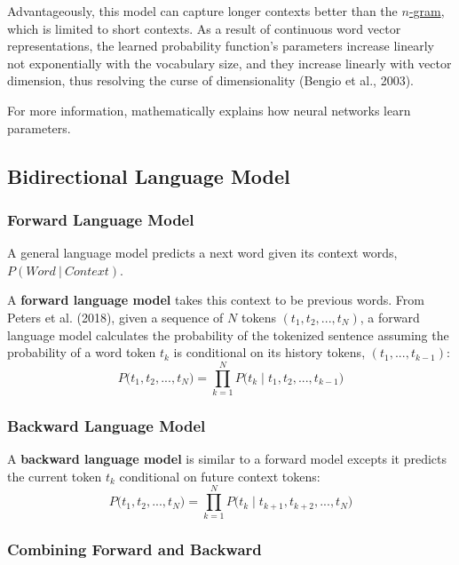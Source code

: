 Advantageously, this model can capture longer contexts better than the \hyperref[sec:NGramLM]{$n$-gram}, which is limited to short contexts. As a result of continuous word vector representations, the learned probability function's parameters increase linearly not exponentially with the vocabulary size, and they increase linearly with vector dimension, thus resolving the curse of dimensionality (Bengio et al., 2003).  

For more information,  mathematically explains how neural networks learn parameters. 


\subsection{Bidirectional Language Model} \label{sec:BidirectionalLM}

\subsubsection{Forward Language Model} \label{sec:ForwardLM}

A general language model predicts a next word given its context words, $P(\textit{Word} \: | \: \textit{Context})$. 

A \textbf{forward language model} takes this context to be previous words. From Peters et al. (2018), given a sequence of $N$ tokens $(t_1, t_2, ..., t_N)$, a forward language model calculates the probability of the tokenized sentence assuming the probability of a word token $t_k$ is conditional on its history tokens, $(t_1, ..., t_{k-1})$:
$$
P \Big(t_1, t_2, ..., t_N \Big) = \prod_{k=1}^N P \Big(t_k \; | \; t_1, t_2, ..., t_{k-1} \Big)
$$

\subsubsection{Backward Language Model} \label{sec:BackwardLM}

A \textbf{backward language model} is similar to a forward model excepts it predicts the current token $t_k$ conditional on future context tokens:
$$
P \Big(t_1, t_2, ..., t_N \Big) = \prod_{k=1}^N P \Big(t_k \; | \; t_{k+1}, t_{k+2}, ..., t_N \Big)
$$

\subsubsection{Combining Forward and Backward}

